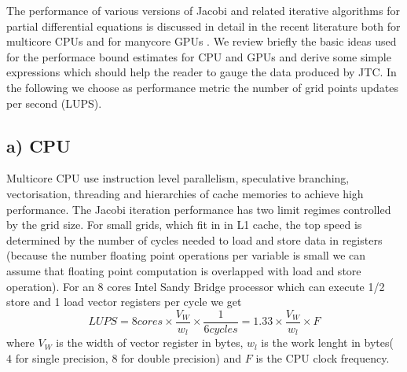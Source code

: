 \documentclass[a4paper,12pt]{article}
\begin{document}
 The performance of various versions of Jacobi and related iterative
 algorithms for partial differential equations is discussed in detail
 in the recent literature both for multicore CPUs
 \cite{Kamil,Shah,Treibig} and for manycore GPUs \cite{Holewinski}.
 We review briefly the basic ideas used for the performace bound
 estimates for CPU and GPUs and derive some simple expressions which
 should help the reader to gauge the data produced by JTC.  In the
 following we choose as performance metric the number of grid points
 updates per second (LUPS).

\subsection*{ a) CPU}

Multicore CPU use instruction level parallelism, speculative branching,
vectorisation, threading and hierarchies of cache memories
to achieve high performance. 
The Jacobi iteration performance has two limit regimes controlled by the
grid size. For small grids, which fit in in L1 cache, the top speed is
determined by the number of cycles needed to load and store  data
in registers (because the number floating point operations per variable
is small we can assume that floating point computation is overlapped with load
and store operation). For an 8 cores Intel Sandy Bridge processor
which can execute 1/2 store and 1 load vector registers per cycle  we get 
\begin{equation}
LUPS=8 cores \times \frac{V_W}{w_l}  \times \frac{1} {6 cycles} = 1.33  \times  \frac{V_W}{w_l} \times F 
\end{equation}
where $V_W$ is the width of vector register in bytes, $w_l$ is the
work lenght in bytes( $4$ for single precision, $8$ for double precision) and
$F$ is the CPU clock frequency.
\end{document}
